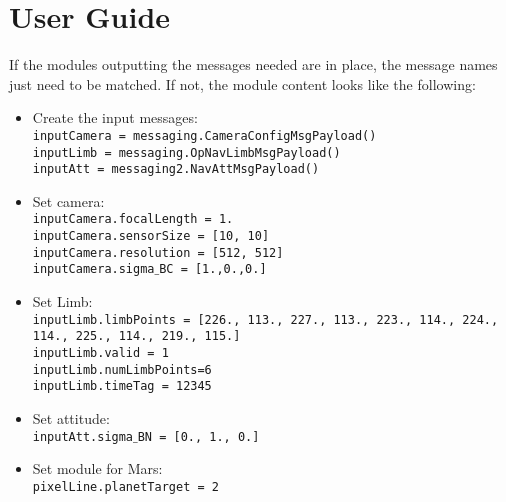 
\section{User Guide}
If the modules outputting the messages needed are in place, the message names just need to be matched. If not, the module content looks like the following:

\begin{itemize}
\item Create the input messages: \\
\texttt{inputCamera = messaging.CameraConfigMsgPayload()} \\
\texttt{inputLimb = messaging.OpNavLimbMsgPayload()}\\
\texttt{inputAtt = messaging2.NavAttMsgPayload()}\\
\item Set camera: \\
\texttt{inputCamera.focalLength = 1.}\\
\texttt{inputCamera.sensorSize = [10, 10]}\\
\texttt{inputCamera.resolution = [512, 512]}\\
\texttt{inputCamera.sigma$\_$BC = [1.,0.,0.]}\\
\item Set Limb: \\
\texttt{inputLimb.limbPoints = [226., 113., 227., 113., 223., 114., 224., 114., 225., 114., 219.,
       115.]}\\
\texttt{inputLimb.valid = 1}\\
\texttt{inputLimb.numLimbPoints=6}\\
\texttt{inputLimb.timeTag = 12345}\\
\item Set attitude: \\
\texttt{inputAtt.sigma$\_$BN = [0., 1., 0.]}\\
\item Set module for Mars: \\
\texttt{pixelLine.planetTarget = 2}\\
  \end{itemize}